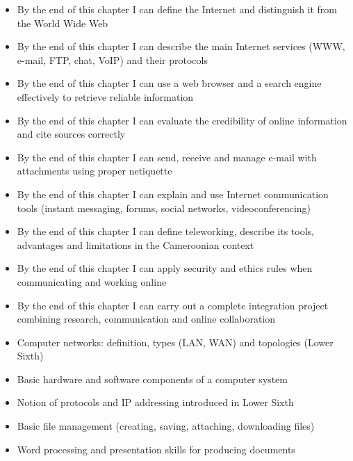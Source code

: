 \documentclass[11pt]{article}
\begin{document}
\begin{objectifs}
\begin{itemize}
\item By the end of this chapter I can define the Internet and distinguish it from the World Wide Web
\item By the end of this chapter I can describe the main Internet services (WWW, e-mail, FTP, chat, VoIP) and their protocols
\item By the end of this chapter I can use a web browser and a search engine effectively to retrieve reliable information
\item By the end of this chapter I can evaluate the credibility of online information and cite sources correctly
\item By the end of this chapter I can send, receive and manage e-mail with attachments using proper netiquette
\item By the end of this chapter I can explain and use Internet communication tools (instant messaging, forums, social networks, videoconferencing)
\item By the end of this chapter I can define teleworking, describe its tools, advantages and limitations in the Cameroonian context
\item By the end of this chapter I can apply security and ethics rules when communicating and working online
\item By the end of this chapter I can carry out a complete integration project combining research, communication and online collaboration
\end{itemize}
\end{objectifs}

\begin{prerequis}
\begin{itemize}
\item Computer networks: definition, types (LAN, WAN) and topologies (Lower Sixth)
\item Basic hardware and software components of a computer system
\item Notion of protocols and IP addressing introduced in Lower Sixth
\item Basic file management (creating, saving, attaching, downloading files)
\item Word processing and presentation skills for producing documents
\end{itemize}
\end{prerequis}

\newpage
\end{document}
